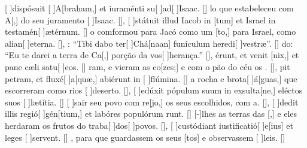 {  %
  {[ ]{dis}pósuit [ ]{A}[braham,] et iuraménti su[ ]{ad}[ ]{I}saac. [\LinkLA]}%
    {lo que estabeleceu com A[,] do seu juramento [ ]{I}{sa}ac. [\LinkPT]},
  {[ ]{stá}tuit illud Iacob in [tum] et Israel in testamén[ ]{æ}{tér}num. [\LinkLA]}%
    { o comformou para Jacó como um [to,] para Israel, como alian[ ]{e}{ter}na. [\LinkPT]},
  {: ``Tibi dabo ter[ ]{Chá}[naan] funículum heredi[ ]{ve}stræ''. [\LinkLA]}%
    {do: ``Eu te darei a terra de Ca[,] porção da vos[ ]{he}{ran}ça.'' [\LinkPT]},
  {érunt, et venit [nix,] et pane cæli satu[ ]{e}os. [\LinkLA]}%
    {ram, e vieram as co[zes;] e com o pão do céu os . [\LinkPT]},
  {pit petram, et fluxé[ ]{a}[quæ,] abiérunt in [ ]{flú}mina. [\LinkLA]}%
    { a rocha e brota[ ]{á}[guas,] que escorreram como rios [ ]{de}{ser}to. [\LinkPT]},
  {[ ]{e}dúxit pópulum suum in exsulta[ne,] eléctos suos [ ]{læ}{tí}tia. [\LinkLA]}%
    {[ ]{sa}ir seu povo com re[jo,] os seus escolhidos, com a. [\LinkPT]},
  {[ ]{de}dit illis regió[ ]{gén}[tium,] et labóres populórum runt. [\LinkLA]}%
    {[-]{lhes} as terras das [,] e eles herdaram os frutos do traba[ ]{dos}[ ]{po}vos. [\LinkPT]},
  {[ ]{cu}stódiant iustificatió[ ]{e}[ius] et leges [ ]{ser}\-vent. [\LinkLA]}%
    {, para que guardassem os seus [tos] e observassem [ ]{leis}. [\LinkPT]}
}